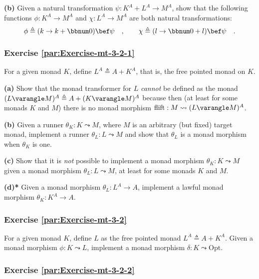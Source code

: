 \textbf{(b)} Given a natural transformation $\psi:K^{A}+L^{A}\rightarrow M^{A}$,
show that the following functions $\phi:K^{A}\rightarrow M^{A}$ and
$\chi:L^{A}\rightarrow M^{A}$ are both natural transformations:
\[
\phi\triangleq(k\rightarrow k+\bbnum 0)\bef\psi\quad,\quad\quad\chi\triangleq(l\rightarrow\bbnum 0+l)\bef\psi\quad.
\]


\subsubsection{Exercise \label{par:Exercise-mt-3-2-1}\ref{par:Exercise-mt-3-2-1}}

For a given monad $K$, define $L^{A}\triangleq A+K^{A}$, that is,
the free pointed monad on $K$.

\textbf{(a)} Show that the monad transformer for $L$ \emph{cannot}
be defined as the monad $(L\varangle M)^{A}\triangleq A+(K\varangle M)^{A}$
because then (at least for some monads $K$ and $M$) there is no
monad morphism $\text{flift}:M\leadsto(L\varangle M)^{A}$.

\textbf{(b)} Given a runner $\theta_{K}:K\leadsto M$, where $M$
is an arbitrary (but fixed) target monad, implement a runner $\theta_{L}:L\leadsto M$
and show that $\theta_{L}$ is a monad morphism when $\theta_{K}$
is one.

\textbf{(c)} Show that it is \emph{not} possible to implement a monad
morphism $\theta_{K}:K\leadsto M$ given a monad morphism $\theta_{L}:L\leadsto M$,
at least for some monads $K$ and $M$.

\textbf{(d){*}} Given a monad morphism $\theta_{L}:L^{A}\rightarrow A$,
implement a lawful monad morphism $\theta_{K}:K^{A}\rightarrow A$. 

\subsubsection{Exercise \label{par:Exercise-mt-3-2}\ref{par:Exercise-mt-3-2}}

For a given monad $K$, define $L$ as the free pointed monad
$L^{A}\triangleq A+K^{A}$. Given a monad morphism $\phi:K\leadsto L$,
implement a monad morphism $\delta:K\leadsto\text{Opt}$.

\subsubsection{Exercise \label{par:Exercise-mt-3-2-2}\ref{par:Exercise-mt-3-2-2}}

